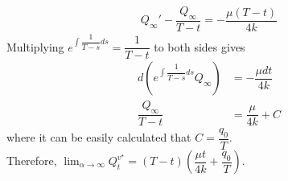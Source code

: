 \documentclass{article}
\begin{document}
\begin{equation*}
    \begin{split}
     Q_{\infty}' - \dfrac{Q_{\infty}}{T-t} = -\dfrac{\mu(T-t)}{4k}
    \end{split}
\end{equation*}
Multiplying $e^{\int \dfrac{1}{T-s}ds} = \dfrac{1}{T-t}$ to both sides gives
\begin{equation*}
    \begin{split}
        d(e^{\int \dfrac{1}{T-s}ds} Q_{\infty}) &= -\dfrac{\mu dt}{4k}\\
        \dfrac{Q_{\infty}}{T-t} &= \dfrac{\mu}{4k} +C
    \end{split}
\end{equation*}
where it can be easily calculated that $C= \dfrac{q_{0}}{T}$.\\
Therefore, $\lim_{\alpha \to \infty} Q_{t}^{v^{\star}} = (T-t)(\dfrac{\mu t}{4k} + \dfrac{q_{0}}{T})$.





\end{document}
